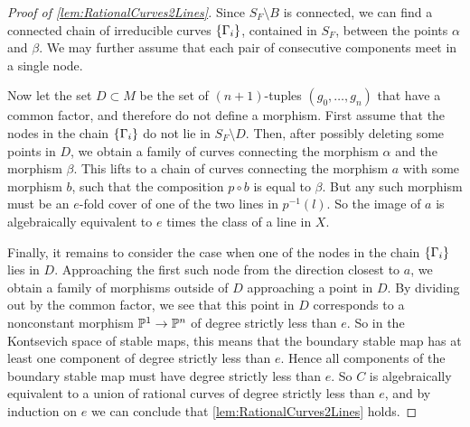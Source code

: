 \begin{proof}[Proof of \cref{lem:RationalCurves2Lines}]
Since $S_F \setminus B$ is connected, we can find a connected chain of irreducible curves $\set{\Gamma_i}$, contained in $S_F$, between the points $\alpha$ and $\beta$. We may further assume that each pair of consecutive components meet in a single node.

Now let the set $D \subset M$ be the set of $(n+1)$-tuples $(g_0,\dots,g_n)$ that have a common factor, and therefore do not define a morphism. First assume that the nodes in the chain $\set{\Gamma_i}$ do not lie in $S_F \setminus D$. Then, after possibly deleting some points in $D$, we obtain a family of curves connecting the morphism $\alpha$ and the morphism $\beta$. This lifts to a chain of curves connecting the morphism $a$ with some morphism $b$, such that the composition $p \circ b$ is equal to $\beta$. But any such morphism must be an $e$-fold cover of one of the two lines in $p^{-1}(l)$. So the image of $a$ is algebraically equivalent to $e$ times the class of a line in $X$.

Finally, it remains to consider the case when one of the nodes in the chain $\set{\Gamma_i}$ lies in $D$. Approaching the first such node from the direction closest to $a$, we obtain a family of morphisms outside of $D$ approaching a point in $D$. By dividing out by the common factor, we see that this point in $D$ corresponds to a nonconstant morphism $\P^1 \to \P^n$ of degree strictly less than $e$. So in the Kontsevich space of stable maps, this means that the boundary stable map has at least one component of degree strictly less than $e$. Hence all components of the boundary stable map must have degree strictly less than $e$. So $C$ is algebraically equivalent to a union of rational curves of degree strictly less than $e$, and by induction on $e$ we can conclude that \cref{lem:RationalCurves2Lines} holds.
\end{proof}

\printbibliography[heading = subbibliography]
\stopcontents[chapters]